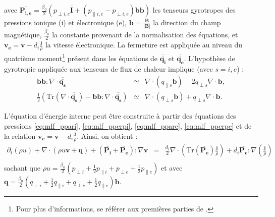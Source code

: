 avec $\overline{\boldsymbol{P_{i,e}}} =  \frac{\beta_0}{2} \left(p_{\perp i,e } \overline{\boldsymbol{I}} + \left(p_{\parallel i,e } - p_{\perp i,e }\right) \boldsymbol{b} \boldsymbol{b} \right) $ les tenseurs gyrotropes des pressions ionique (i) et électronique (e), $\boldsymbol{b} = \frac{\boldsymbol{B}}{|\boldsymbol{B}|}$ la direction du champ magnétique, $\frac{\beta_0}{2} $ la constante provenant de la normalisation des équations, et $\boldsymbol{v_e} = \boldsymbol{v} - d_i \frac{\boldsymbol{j}}{\rho} $ la vitesse électronique. La fermeture est appliquée au niveau du quatrième moment\footnote{Pour plus d'informations, se référer aux premières parties de \cite{passot_collisionless_2007}.} présent dans les équations de $ \overline{\overline{\boldsymbol{q_i}}}$ et $ \overline{\overline{\boldsymbol{q_e}}}$. L'hypothèse de gyrotropie appliquée aux tenseurs de flux de chaleur implique (avec $s = i,e$) :  
\begin{eqnarray*}
    \boldsymbol{b}\boldsymbol{b} : \nabla \cdot \overline{\overline{\boldsymbol{q_s}}} &\simeq& \nabla \cdot (q_{\parallel s} \boldsymbol{b}) - 2 q_{\perp s} \nabla \cdot \boldsymbol{b},\\
    \frac{1}{2} \left( \text{Tr}(\nabla \cdot \overline{\overline{\boldsymbol{q_s}}}) - \boldsymbol{b}\boldsymbol{b} : \nabla \cdot \overline{\overline{\boldsymbol{q_s}}} \right)  &\simeq&  \nabla \cdot (q_{\perp s} \boldsymbol{b})  + q_{\perp s} \nabla \cdot \boldsymbol{b}.
\end{eqnarray*}


L'équation d'énergie interne peut être construite à partir des équations des pressions \eqref{eq:mlf_ppari}, \eqref{eq:mlf_pperpi}, \eqref{eq:mlf_ppare}, \eqref{eq:mlf_pperpe} et de la relation $\boldsymbol{v_e} = \boldsymbol{v} - d_i \frac{\boldsymbol{j}}{\rho} $. Ainsi, on obtient :
\begin{eqnarray}
\label{eq:mlf_ui} \partial_t \left(\rho u\right) + \nabla \cdot \left(\rho u \boldsymbol{v} + \boldsymbol{q}\right) +   \left(\overline{\boldsymbol{P_i}} + \overline{\boldsymbol{P_e}} \right): \nabla \boldsymbol{v} &=& \frac{d_i}{2}  \nabla \cdot  \left(\text{Tr} \left(\overline{\boldsymbol{P_e}}\right)  \frac{ \boldsymbol{j}}{\rho} \right) +  d_i \overline{\boldsymbol{P_{e}}} : \nabla \left(\frac{\boldsymbol{j}}{\rho} \right)\nonumber \\ 
\end{eqnarray}
sachant que $\rho u = \frac{\beta_0}{2} \left(p_{\perp i } + \frac{1}{2}p_{\parallel i} + p_{\perp e } + \frac{1}{2}p_{\parallel e} \right) $ et avec $\boldsymbol{q} = \frac{\beta_0}{2} \left(q_{\perp i } + \frac{1}{2}q_{\parallel i} + q_{\perp e } + \frac{1}{2}q_{\parallel e} \right)  \boldsymbol{b}$. 

